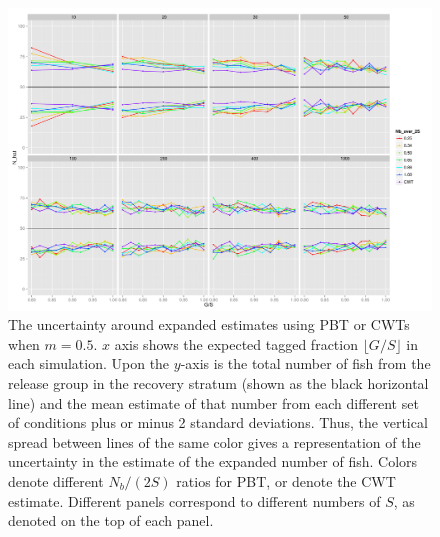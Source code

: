 \documentclass[11pt]{article}
\begin{document}
\begin{figure}
\includegraphics[width = .93\textwidth]{./images/sd_line_horns_m_0_5.pdf}
\caption{The uncertainty around expanded estimates using PBT or CWTs when $m = 0.5$.  $x$ axis shows the
expected tagged fraction $\lfloor G/S \rfloor$ in each simulation. Upon the $y$-axis is the total number of fish from the
release group in the recovery stratum (shown as the black horizontal line) and the mean estimate of that number from each different set of 
conditions plus or minus 2 standard deviations.  Thus, the vertical spread between lines of the same color gives a representation
of the uncertainty in the estimate of the expanded number of fish. Colors denote different $N_b/(2S)$ ratios for PBT, or denote
the CWT estimate.  Different
panels correspond to different numbers of $S$, as denoted on the top of each panel.
\label{fig:horn0.5}}
\end{figure}
\end{document}
